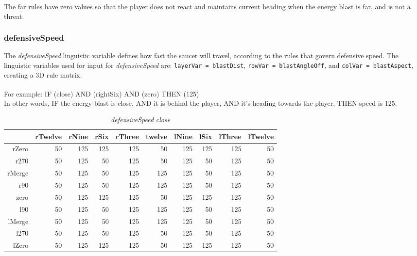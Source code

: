 The far rules have zero values so that the player does not react and maintains current heading when the energy blast is far, and is not a threat.

\subsubsection{defensiveSpeed}

The \emph{defensiveSpeed} linguistic variable defines how fast the saucer will travel, according to the rules that govern defensive speed. The linguistic variables used for input for \emph{defensiveSpeed} are: \texttt{layerVar = blastDist}, \texttt{rowVar = blastAngleOff}, and \texttt{colVar = blastAspect}, creating a 3D rule matrix.
\\
\\
For example: IF (close) AND (rightSix) AND (zero) THEN (125) \\
In other words, IF the energy blast is close, AND it is behind the player, AND it's heading towards the player, THEN speed is 125.

\begin{table}[H]
\centering
\caption{\emph{defensiveSpeed} \emph{close}}
\label{Turn rule table}
\begin{tabular}{r|r|r|r|r|r|r|r|r|r}
 		& rTwelve 	& rNine 	& rSix 		& rThree 		& twelve 	& lNine 	& lSix 		& lThree	& lTwelve		\\ \hline
rZero	& 50		& 125		& 125		& 125 		 	& 50		& 125		& 125 		& 125		& 50			\\
r270	& 50		& 125		& 50		& 125			& 50		& 125		& 50		& 125		& 50			\\
rMerge	& 50		& 125		& 50	 	& 125			& 125		& 125		& 50		& 125		& 50			\\
r90		& 50		& 125		& 50 		& 125			& 125		& 125		& 50		& 125		& 50			\\
zero 	& 50		& 125 		& 125 		& 125			& 50		& 125		& 125		& 125		& 50			\\
l90 	& 50		& 125 		& 50		& 125			& 125		& 125		& 50		& 125		& 50			\\
lMerge	& 50		& 125 		& 50	 	& 125			& 125		& 125		& 50		& 125		& 50			\\
l270 	& 50		& 125	 	& 50 		& 125			& 50		& 125		& 50		& 125		& 50			\\
lZero 	& 50		& 125 		& 125	 	& 125			& 50		& 125  		& 125		& 125		& 50			\\
\end{tabular}
\end{table}

